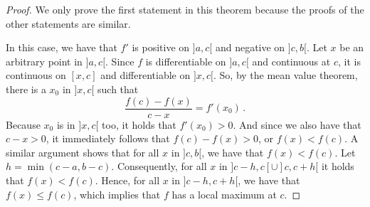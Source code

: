 \ifanalysis

\begin{proof}
We only prove the first statement in this theorem because the proofs of the other statements are similar. 

In this case, we have that $f'$ is positive on $]a,c[$ and negative on $]c,b[$. Let $x$ be an arbitrary point in $]a,c[$. Since $f$ is differentiable on $]a,c[$ and continuous at $c$, it is continuous on $[x,c]$ and differentiable on $]x,c[$. So, by the mean value theorem, there is a $x_0$ in $]x,c[$ such that
$$
\dfrac{f(c)-f(x)}{c-x}=f'(x_0)\,.
$$
Because $x_0$ is in $]x,c[$ too, it holds that $f'(x_0)>0$. And since we also have that $c-x>0$, it immediately follows that $f(c)-f(x)>0$, or $f(x)<f(c)$. A similar argument shows that for all $x$ in $]c,b[$, we have that $f(x)<f(c)$. Let $h=\min(c-a,b-c)$. Consequently, for all $x$ in $]c-h,c[\cup]c,c+h[$ it holds that $f(x)<f(c)$. Hence, for all $x$ in $]c-h,c+h[$, we have that $f(x)\leq f(c)$, which implies that $f$ has a local maximum at $c$.
\end{proof}


\fi

